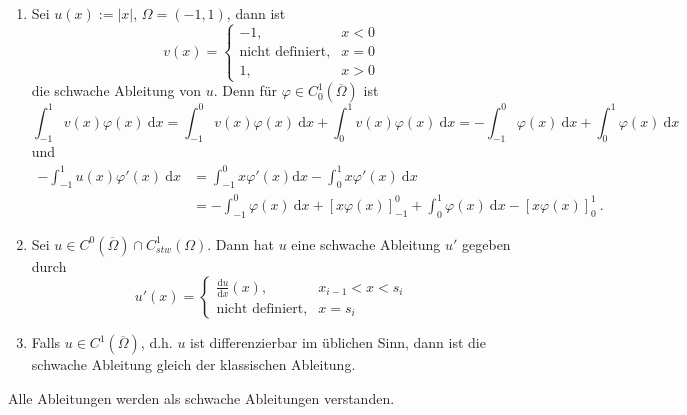 \begin{bspe}
    \begin{enumerate}
        \item Sei $u(x) := |x|$, $\Omega = (-1,1)$, dann ist
            \[
                v(x) = \begin{cases}
                    -1, & x < 0 \\
                    \text{nicht definiert}, & x = 0 \\
                    1, & x > 0
                \end{cases}
            \]
            die schwache Ableitung von $u$.
            Denn für $\varphi \in C_0^1(\overline \Omega)$ ist
            \[
                \int_{-1}^1 v(x) \varphi(x) \ \mathrm dx
                    = \int_{-1}^0 v(x) \varphi(x) \ \mathrm dx + \int_0^1 v(x) \varphi(x) \ \mathrm dx
                    = - \int_{-1}^0 \varphi(x) \ \mathrm dx + \int_0^1 \varphi(x) \ \mathrm dx
            \]
            und
            \begin{align*}
                - \int_{-1}^1 u(x) \varphi'(x) \ \mathrm dx
                &= \int_{-1}^0 x \varphi'(x) \mathrm dx - \int_0^1 x \varphi'(x) \ \mathrm dx \\
                &= - \int_{-1}^0 \varphi(x) \ \mathrm dx + \left[ x \varphi(x) \right]_{-1}^0
                + \int_0^1 \varphi(x) \ \mathrm dx - \left[ x \varphi(x) \right]_0^1 \ .
            \end{align*}
        \item Sei $u \in C^0(\overline \Omega) \cap C_{stw}^1(\Omega)$. Dann hat $u$ eine schwache Ableitung $u'$ gegeben
            durch
            \[
                u'(x) = \begin{cases}
                    \frac{\mathrm du}{\mathrm dx}(x), & x_{i-1} < x < s_i \\
                    \text{nicht definiert}, & x = s_i
                \end{cases}
            \]
        \item Falls $u \in C^1(\overline \Omega)$, d.h. $u$ ist differenzierbar im üblichen Sinn, dann ist die schwache
            Ableitung gleich der klassischen Ableitung.
    \end{enumerate}
\end{bspe}

\begin{konv}
Alle Ableitungen werden als schwache Ableitungen verstanden.
\end{konv}

